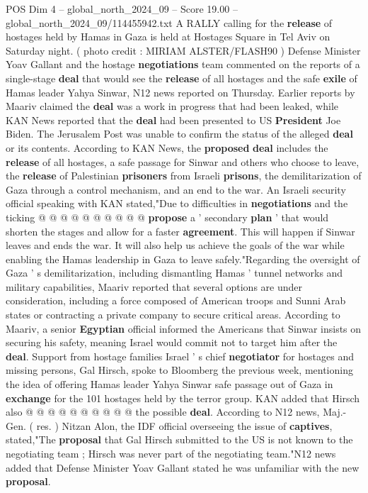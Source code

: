 \begin{textsample}{POS Dim 4 – global\_north\_2024\_09 – Score 19.00 – global\_north\_2024\_09/114455942.txt}  \label{ex:f4_pos_318}
A RALLY calling for the \textbf{release} of hostages held by Hamas in Gaza is held at Hostages Square in Tel Aviv on Saturday night. ( photo credit : MIRIAM ALSTER/FLASH90 ) Defense Minister Yoav Gallant and the hostage \textbf{negotiations} team commented on the reports of a single-stage \textbf{deal} that would see the \textbf{release} of all hostages and the safe \textbf{exile} of Hamas leader Yahya Sinwar, N12 news reported on Thursday.
Earlier reports by Maariv claimed the \textbf{deal} was a work in progress that had been leaked, while KAN News reported that the \textbf{deal} had been presented to US \textbf{President} Joe Biden.
The Jerusalem Post was unable to confirm the status of the alleged \textbf{deal} or its contents.
According to KAN News, the \textbf{proposed} \textbf{deal} includes the \textbf{release} of all hostages, a safe passage for Sinwar and others who choose to leave, the \textbf{release} of Palestinian \textbf{prisoners} from Israeli \textbf{prisons}, the demilitarization of Gaza through a control mechanism, and an end to the war.
An Israeli security official speaking with KAN stated,"Due to difficulties in \textbf{negotiations} and the ticking @ @ @ @ @ @ @ @ @ @ \textbf{propose} a ' secondary \textbf{plan} ' that would shorten the stages and allow for a faster \textbf{agreement}.
This will happen if Sinwar leaves and ends the war.
It will also help us achieve the goals of the war while enabling the Hamas leadership in Gaza to leave safely."Regarding the oversight of Gaza ' s demilitarization, including dismantling Hamas ' tunnel networks and military capabilities, Maariv reported that several options are under consideration, including a force composed of American troops and Sunni Arab states or contracting a private company to secure critical areas.
According to Maariv, a senior \textbf{Egyptian} official informed the Americans that Sinwar insists on securing his safety, meaning Israel would commit not to target him after the \textbf{deal}.
Support from hostage families Israel ' s chief \textbf{negotiator} for hostages and missing persons, Gal Hirsch, spoke to Bloomberg the previous week, mentioning the idea of offering Hamas leader Yahya Sinwar safe passage out of Gaza in \textbf{exchange} for the 101 hostages held by the terror group.
KAN added that Hirsch also @ @ @ @ @ @ @ @ @ @ the possible \textbf{deal}.
According to N12 news, Maj.-Gen. ( res. ) Nitzan Alon, the IDF official overseeing the issue of \textbf{captives}, stated,"The \textbf{proposal} that Gal Hirsch submitted to the US is not known to the negotiating team ; Hirsch was never part of the negotiating team."N12 news added that Defense Minister Yoav Gallant stated he was unfamiliar with the new \textbf{proposal}.

\end{textsample}
